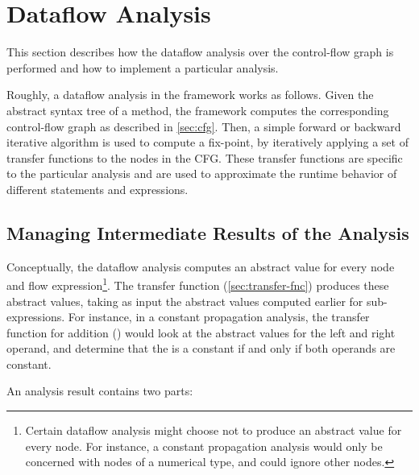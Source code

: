 \section{Dataflow Analysis}

This section describes how the dataflow analysis over the control-flow
graph is performed and how to implement a particular analysis.

Roughly, a dataflow analysis in the framework works as follows. Given
the abstract syntax tree of a method, the framework computes the
corresponding control-flow graph as described in
\autoref{sec:cfg}. Then, a simple forward or backward iterative
algorithm is used to compute a fix-point, by iteratively applying a
set of transfer functions to the nodes in the CFG\@.  These transfer
functions are specific to the particular analysis and are used to
approximate the runtime behavior of different statements and expressions.


\subsection{Managing Intermediate Results of the Analysis}
\label{sec:node-mapping}
\label{sec:store-management}


Conceptually, the dataflow analysis computes an abstract value for
every node and flow expression\footnote{Certain dataflow analysis
  might choose not to produce an abstract value for every node.  For
  instance, a constant propagation analysis would only be concerned
  with nodes of a numerical type, and could ignore other nodes.}.  The
transfer function (\autoref{sec:transfer-fnc}) produces these abstract
values, taking as input the abstract values computed earlier for
sub-expressions.  For instance, in a constant propagation analysis,
the transfer function for addition (\code{+}) would look at the
abstract values for the left and right operand, and determine that the
 is a constant if and only if both operands are
constant.

An analysis result contains two parts:

